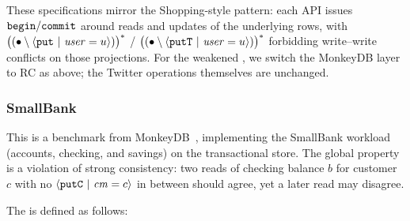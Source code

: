 \vspace{-.4cm}\par\nobreak\noindent
These specifications mirror the Shopping-style pattern: each API issues \(\boldsymbol{{\tt begin}}/\boldsymbol{{\tt commit}}\) around reads and updates of the underlying rows, with \({\bigl((\bullet \setminus {   {\langle} {\boldsymbol{{\tt put}}~|~{\mathit{user}=u}}  {\rangle} })\bigr)^{\ast}}\) / \({\bigl((\bullet \setminus {   {\langle} {\boldsymbol{{\tt putT}}~|~{\mathit{user}=u}}  {\rangle} })\bigr)^{\ast}}\) forbidding write--write conflicts on those projections. For the weakened \tyName{}, we switch the MonkeyDB layer to RC as above; the Twitter operations themselves are unchanged.

\newpage
\subsubsection*{SmallBank} This is a benchmark from MonkeyDB~\cite{MonkeyDB}, implementing the SmallBank workload (accounts, checking, and savings) on the transactional store. The global property is a violation of strong consistency: two reads of checking balance \(b\) for customer \(c\) with no \({\langle} {\boldsymbol{{\tt putC}}~|~{\mathit{cm}=c}} {\rangle}\) in between should agree, yet a later read may disagree.
\vspace{-.35cm}\par{}
\vspace{-.4cm}\par\nobreak\noindent
The \tyName{} is defined as follows:
